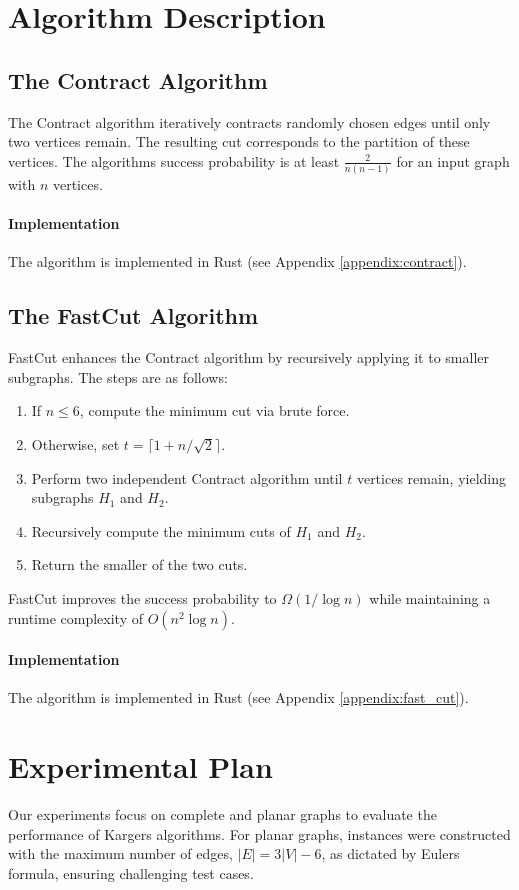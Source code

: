 \documentclass{article}
\theoremstyle{plain} %
\begin{document}
\section{Algorithm Description}

\subsection{The Contract Algorithm}
The Contract algorithm iteratively contracts randomly chosen edges until only two vertices remain. The resulting cut corresponds to the partition of these vertices. The algorithm\textquotesingle{}s success probability is at least $\frac{2}{n(n-1)}$ for an input graph with $n$ vertices. 

\paragraph{Implementation} The algorithm is implemented in Rust (see Appendix \ref{appendix:contract}).

\subsection{The FastCut Algorithm}
FastCut enhances the Contract algorithm by recursively applying it to smaller subgraphs. The steps are as follows:
\begin{enumerate}
    \item If $n \leq 6$, compute the minimum cut via brute force.
    \item Otherwise, set $t = \lceil 1 + n/\sqrt{2} \rceil$.
    \item Perform two independent Contract algorithm until $t$ vertices remain, yielding subgraphs $H_1$ and $H_2$.
    \item Recursively compute the minimum cuts of $H_1$ and $H_2$.
    \item Return the smaller of the two cuts.
\end{enumerate}

FastCut improves the success probability to $\Omega(1/\log n)$ while maintaining a runtime complexity of $O(n^2 \log n)$.

\paragraph{Implementation} The algorithm is implemented in Rust (see Appendix \ref{appendix:fast_cut}).


\section{Experimental Plan}
Our experiments focus on complete and planar graphs to evaluate the performance of Karger\textquotesingle{}s algorithms. For planar graphs, instances were constructed with the maximum number of edges, $|E| = 3|V| - 6$, as dictated by Euler\textquotesingle{}s formula, ensuring challenging test cases.
\end{document}
